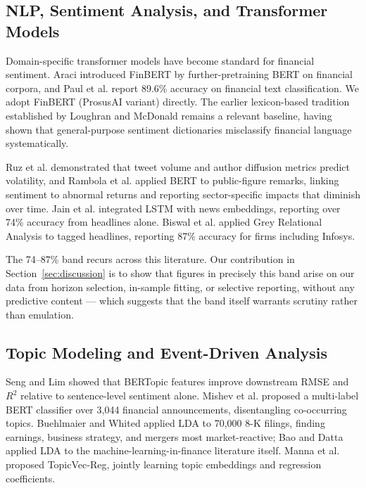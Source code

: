 \documentclass[11pt]{article}
\begin{document}
\subsection{NLP, Sentiment Analysis, and Transformer Models}

Domain-specific transformer models have become standard for financial sentiment. Araci \cite{araci2019} introduced FinBERT by further-pretraining BERT on financial corpora, and Paul et al. \cite{paul2024} report 89.6\% accuracy on financial text classification. We adopt FinBERT (ProsusAI variant) directly. The earlier lexicon-based tradition established by Loughran and McDonald \cite{loughran2011} remains a relevant baseline, having shown that general-purpose sentiment dictionaries misclassify financial language systematically.

Ruz et al. \cite{ruz2024} demonstrated that tweet volume and author diffusion metrics predict volatility, and Rambola et al. \cite{rambola2021} applied BERT to public-figure remarks, linking sentiment to abnormal returns and reporting sector-specific impacts that diminish over time. Jain et al. \cite{jain2023} integrated LSTM with news embeddings, reporting over 74\% accuracy from headlines alone. Biswal et al. \cite{biswal2022} applied Grey Relational Analysis to tagged headlines, reporting 87\% accuracy for firms including Infosys.

The 74--87\% band recurs across this literature. Our contribution in Section~\ref{sec:discussion} is to show that figures in precisely this band arise on our data from horizon selection, in-sample fitting, or selective reporting, without any predictive content --- which suggests that the band itself warrants scrutiny rather than emulation.

\subsection{Topic Modeling and Event-Driven Analysis}

Seng and Lim \cite{seng2023} showed that BERTopic features improve downstream RMSE and $R^2$ relative to sentence-level sentiment alone. Mishev et al. \cite{mishev2022} proposed a multi-label BERT classifier over 3{,}044 financial announcements, disentangling co-occurring topics. Buehlmaier and Whited \cite{buehlmaier2018} applied LDA to 70{,}000 8-K filings, finding earnings, business strategy, and mergers most market-reactive; Bao and Datta \cite{bao2019} applied LDA to the machine-learning-in-finance literature itself. Manna et al. \cite{manna2022} proposed TopicVec-Reg, jointly learning topic embeddings and regression coefficients.
\end{document}
